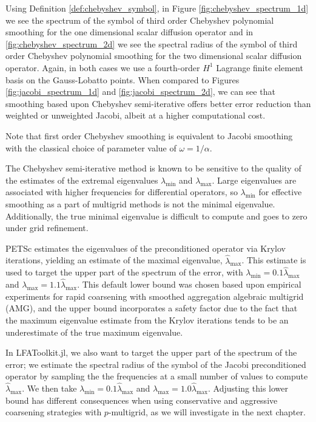 Using Definition \ref{def:chebyshev_symbol}, in Figure \ref{fig:chebyshev_spectrum_1d} we see the spectrum of the symbol of third order Chebyshev polynomial smoothing for the one dimensional scalar diffusion operator and in \ref{fig:chebyshev_spectrum_2d} we see the spectral radius of the symbol of third order Chebyshev polynomial smoothing for the two dimensional scalar diffusion operator.
Again, in both cases we use a fourth-order $H^1$ Lagrange finite element basis on the Gauss-Lobatto points.
When compared to Figures \ref{fig:jacobi_spectrum_1d} and \ref{fig:jacobi_spectrum_2d}, we can see that smoothing based upon Chebyshev semi-iterative offers better error reduction than weighted or unweighted Jacobi, albeit at a higher computational cost.

Note that first order Chebyshev smoothing is equivalent to Jacobi smoothing with the classical choice of parameter value of $\omega = 1 / \alpha$.

The Chebyshev semi-iterative method is known to be sensitive to the quality of the estimates of the extremal eigenvalues $\lambda_{\text{min}}$ and $\lambda_{\text{max}}$.
Large eigenvalues are associated with higher frequencies for differential operators, so $\lambda_{\text{min}}$ for effective smoothing as a part of  multigrid methods is not the minimal eigenvalue.
Additionally, the true minimal eigenvalue is difficult to compute and goes to zero under grid refinement.

PETSc \cite{petsc-user-ref} estimates the eigenvalues of the preconditioned operator via Krylov iterations, yielding an estimate of the maximal eigenvalue, $\hat{\lambda}_{\text{max}}$.
This estimate is used to target the upper part of the spectrum of the error, with $\lambda_{\text{min}} = 0.1 \hat{\lambda}_{\text{max}}$ and $\lambda_{\text{max}} = 1.1 \hat{\lambda}_{\text{max}}$.
This default lower bound was chosen based upon empirical experiments for rapid coarsening with smoothed aggregation algebraic multigrid (AMG), and the upper bound incorporates a safety factor due to the fact that the maximum eigenvalue estimate from the Krylov iterations tends to be an underestimate of the true maximum eigenvalue.

In LFAToolkit.jl, we also want to target the upper part of the spectrum of the error; we estimate the spectral radius of the symbol of the Jacobi preconditioned operator by sampling the the frequencies at a small number of values to compute $\hat{\lambda}_{\text{max}}$.
We then take $\lambda_{\text{min}} = 0.1 \hat{\lambda}_{\text{max}}$ and $\lambda_{\text{max}} = 1.0 \hat{\lambda}_{\text{max}}$.
Adjusting this lower bound has different consequences when using conservative and aggressive coarsening strategies with $p$-multigrid, as we will investigate in the next chapter.
